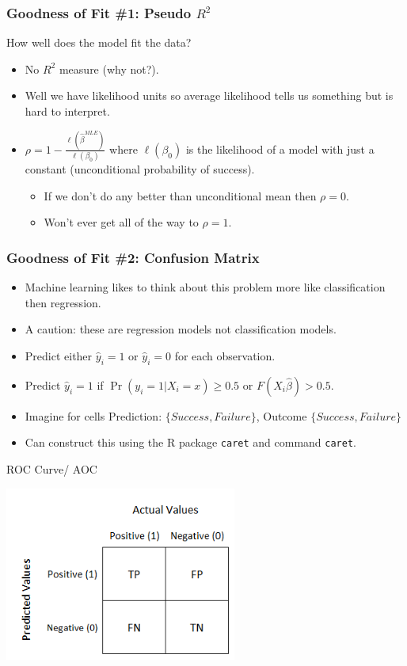 \documentclass[aspectratio=169,11pt]{beamer}
\begin{document}
\begin{frame}
\frametitle{Goodness of Fit \#1: Pseudo $R^2$}
How well does the model fit the data?
\begin{itemize} 
\item No $R^2$ measure (why not?).
\item Well we have likelihood units so average likelihood tells us something but is hard to interpret.
\item $\rho = 1- \frac{\ell(\hat{\beta}^{MLE})}{\ell(\beta_0)}$ where $\ell(\beta_0)$ is the likelihood of a model with just a constant (unconditional probability of success).
\begin{itemize}
\item If we don't do any better than unconditional mean then $\rho=0$.
\item Won't ever get all of the way to $\rho =1$.
\end{itemize}
\end{itemize}
\end{frame}

\begin{frame}
\frametitle{Goodness of Fit \#2: Confusion Matrix }
\begin{itemize} 
\item Machine learning likes to think about this problem more like \alert{classification} then regression.
\item A caution: these are \alert{regression} models not \alert{classification} models.
\item Predict either $\hat{y}_i = 1$ or $\hat{y}_i = 0$ for each observation.
\item Predict $\hat{y}_i =1$ if $\Pr(y_i = 1 | X_i =x) \geq0.5$ or $F(X_i \hat{\beta}) > 0.5$.
\item Imagine for cells Prediction: $\{Success, Failure\}$, Outcome $\{Success, Failure\}$
\item Can construct this using the R package \texttt{caret} and command \texttt{caret}.
\end{itemize}
\end{frame}


\begin{frame}{ROC Curve/ AOC}
\begin{center}
\includegraphics[width=3in]{resources/confusion.png}\\
\end{center}
\end{frame}
\end{document}
